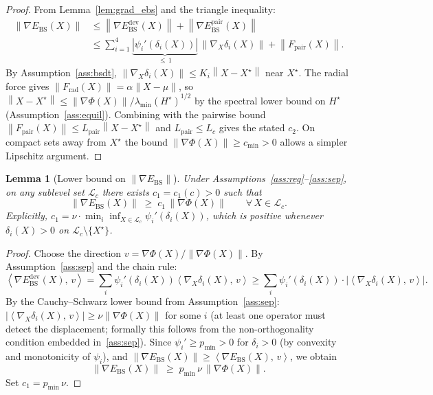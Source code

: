 \documentclass[11pt]{article}
\newtheorem{lemma}[theorem]{Lemma}
\theoremstyle{definition}
\newcommand{\Xst}{X^{\star}}
\newcommand{\grad}{\nabla}
\newcommand{\Ebs}{E_{\mathrm{BS}}}
\newcommand{\Lpair}{L_{\mathrm{pair}}}
\newcommand{\lmin}{\lambda_{\min}}
\newcommand{\norm}[1]{\left\|#1\right\|}
\newcommand{\inner}[2]{\left\langle #1,\, #2\right\rangle}
\begin{document}
\begin{proof}
From Lemma~\ref{lem:grad_ebs} and the triangle inequality:
\begin{align*}
  \norm{\grad\Ebs(X)}
  &\le \norm{\grad\Ebs^{\mathrm{dev}}(X)} + \norm{\grad\Ebs^{\mathrm{pair}}(X)} \\
  &\le \sum_{i=1}^4 \underbrace{|\psi_i'(\delta_i(X))|}_{{\le\, 1}}\,
       \norm{\grad_X\delta_i(X)}
       + \norm{F_{\mathrm{pair}}(X)}.
\end{align*}
By Assumption~\ref{ass:bsdt}, $\norm{\grad_X\delta_i(X)} \le K_i\norm{X-\Xst}$
near $\Xst$.
The radial force gives $\norm{F_{\mathrm{rad}}(X)} = \alpha\norm{X - \mu}$, so
$\norm{X - \Xst} \le \norm{\grad\Phi(X)}/\lmin(H^\star)^{1/2}$ by the
spectral lower bound on $H^\star$ (Assumption~\ref{ass:equil}).  Combining
with the pairwise bound $\norm{F_{\mathrm{pair}}(X)} \le \Lpair\norm{X-\Xst}$
and $\Lpair \le L_c$ gives the stated $c_2$.
On compact sets away from $\Xst$ the bound $\norm{\grad\Phi(X)} \ge c_{\min} > 0$
allows a simpler Lipschitz argument.
\end{proof}

\begin{lemma}[Lower bound on $\norm{\grad\Ebs}$]
\label{lem:lower}
Under Assumptions~\ref{ass:reg}--\ref{ass:sep}, on any sublevel set
$\mathcal{L}_c$ there exists $c_1 = c_1(c) > 0$ such that
\[
  \norm{\grad\Ebs(X)} \;\ge\; c_1\,\norm{\grad\Phi(X)}
  \qquad \forall\, X \in \mathcal{L}_c.
\]
Explicitly, $c_1 = \nu \cdot \min_i\inf_{X\in\mathcal{L}_c}\psi_i'(\delta_i(X))$,
which is positive whenever $\delta_i(X) > 0$ on $\mathcal{L}_c\setminus\{\Xst\}$.
\end{lemma}

\begin{proof}
Choose the direction $v = \grad\Phi(X)/\norm{\grad\Phi(X)}$.  By
Assumption~\ref{ass:sep} and the chain rule:
\[
  \inner{\grad\Ebs^{\mathrm{dev}}(X)}{v}
  = \sum_i \psi_i'(\delta_i(X))\inner{\grad_X\delta_i(X)}{v}
  \ge \sum_i \psi_i'(\delta_i(X))\cdot|\inner{\grad_X\delta_i(X)}{v}|.
\]
By the Cauchy--Schwarz lower bound from Assumption~\ref{ass:sep}:
$|\inner{\grad_X\delta_i(X)}{v}| \ge \nu\norm{\grad\Phi(X)}$ for some $i$
(at least one operator must detect the displacement; formally this follows from
the non-orthogonality condition embedded in~\ref{ass:sep}).
Since $\psi_i' \ge p_{\min} > 0$ for $\delta_i > 0$ (by convexity and
monotonicity of $\psi_i$), and $\norm{\grad\Ebs(X)}
\ge \inner{\grad\Ebs(X)}{v}$, we obtain
\[
  \norm{\grad\Ebs(X)} \;\ge\; p_{\min}\,\nu\,\norm{\grad\Phi(X)}.
\]
Set $c_1 = p_{\min}\,\nu$.
\end{proof}
\end{document}
